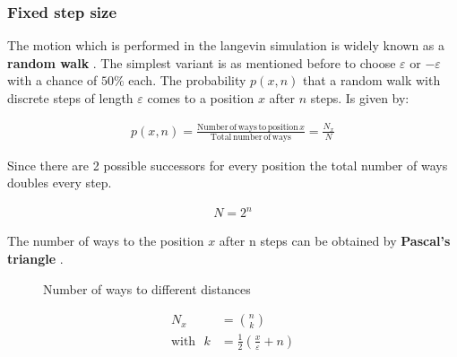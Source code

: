 \documentclass[a4paper, parskip=half]{scrartcl}
\newcommand{\effect}[1]{%
	\textbf{#1}%
}
\begin{document}
\subsubsection{Fixed step size}
The motion which is performed in the langevin simulation is widely known as a \effect{random walk}. The simplest variant is as mentioned before to choose $\varepsilon$ or $-\varepsilon$ with a chance of $50\%$ each. The probability $p(x, n)$ that a random walk with discrete steps of length $\varepsilon$ comes to a position $x$ after $n$ steps. Is given by:

\begin{align}
p(x, n) = \frac{\mathrm{Number\, of\, ways\, to\, position\,} x}{\mathrm{Total\, number\, of\, ways}} = \frac{N_x}{N}
\end{align}

Since there are 2 possible successors for every position the total number of ways  doubles every step.

\begin{align}
N = 2^n
\end{align}

The number of ways to the position $x$ after n steps can be obtained by \effect{Pascal's triangle}.

\begin{figure}[ht!]
\centering
{}
\caption{Number of ways to different distances}
\end{figure}

\begin{align}
N_x &= \binom{n}{k}\\
\mathrm{with} \, \, \,\, k &= \frac{1}{2}\left(\frac{x}{\varepsilon} + n \right)
\end{align}
\end{document}
